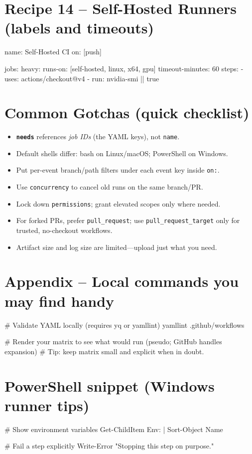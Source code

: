 \documentclass[11pt]{article}
\begin{document}
\newpage
\section{Recipe 14 – Self-Hosted Runners (labels and timeouts)}
\begin{listing}[H]
\caption{Self-hosted with custom labels and timeout}
\begin{yamlcode}
name: Self-Hosted CI
on: [push]

jobs:
  heavy:
    runs-on: [self-hosted, linux, x64, gpu]
    timeout-minutes: 60
    steps:
      - uses: actions/checkout@v4
      - run: nvidia-smi || true
\end{yamlcode}
\end{listing}

\newpage
\section{Common Gotchas (quick checklist)}
\begin{itemize}
  \item \textbf{\texttt{needs}} references \emph{job IDs} (the YAML keys), not \texttt{name}.
  \item Default shells differ: bash on Linux/macOS; PowerShell on Windows.
  \item Put per-event branch/path filters under each event key inside \texttt{on:}.
  \item Use \texttt{concurrency} to cancel old runs on the same branch/PR.
  \item Lock down \texttt{permissions}; grant elevated scopes only where needed.
  \item For forked PRs, prefer \texttt{pull\_request}; use \texttt{pull\_request\_target} only for trusted, no-checkout workflows.
  \item Artifact size and log size are limited—upload just what you need.
\end{itemize}

\section*{Appendix – Local commands you may find handy}
\begin{bashcode}
# Validate YAML locally (requires yq or yamllint)
yamllint .github/workflows

# Render your matrix to see what would run (pseudo; GitHub handles expansion)
# Tip: keep matrix small and explicit when in doubt.
\end{bashcode}

\section*{PowerShell snippet (Windows runner tips)}
\begin{pscode}
# Show environment variables
Get-ChildItem Env: | Sort-Object Name

# Fail a step explicitly
Write-Error "Stopping this step on purpose."
\end{pscode}
\end{document}
